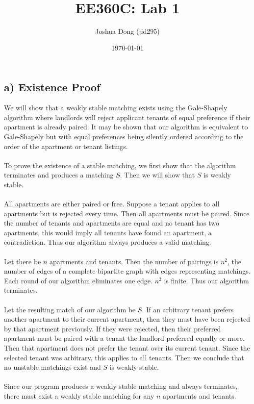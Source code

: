 \documentclass{article}
\begin{document}
\title{EE360C: Lab 1}
\author{Joshua Dong (jid295)}
\date{\today}
\maketitle

\subsection*{a) Existence Proof}
We will show that a weakly stable matching exists using the Gale-Shapely
algorithm where landlords will reject applicant tenants of equal preference if
their apartment is already paired. It may be shown that our algorithm is
equivalent to Gale-Shapely but with equal preferences being silently ordered
according to the order of the apartment or tenant listings.
\\\\
To prove the existence of a stable matching, we first show that the algorithm
terminates and produces a matching $S$. Then we will show that $S$ is weakly
stable.
\\\\
All apartments are either paired or free. Suppose a tenant applies to all
apartments but is rejected every time. Then all apartments must be paired.
Since the number of tenants and apartments are equal and no tenant has
two apartments, this would imply all tenants have found an apartment,
a contradiction. Thus our algorithm always produces a valid matching.
\\\\
Let there be $n$ apartments and tenants. Then the number of pairings is
$n^2$, the number of edges of a complete bipartite graph with edges
representing matchings. Each round of our algorithm eliminates one edge.
$n^2$ is finite. Thus our algorithm terminates.
\\\\
Let the resulting match of our algorithm be $S$. If an arbitrary tenant prefers
another apartment to their current apartment, then they must have been
rejected by that apartment previously. If they were rejected, then their
preferred apartment must be paired with a tenant the landlord preferred
equally or more. Then that apartment does not prefer the tenant over its
current tenant. Since the selected tenant was arbitrary, this applies to all
tenants. Then we conclude that no unstable matchings exist and $S$ is weakly
stable.
\\\\
Since our program produces a weakly stable matching and always terminates,
there must exist a weakly stable matching for any $n$ apartments and tenants.
\end{document}
